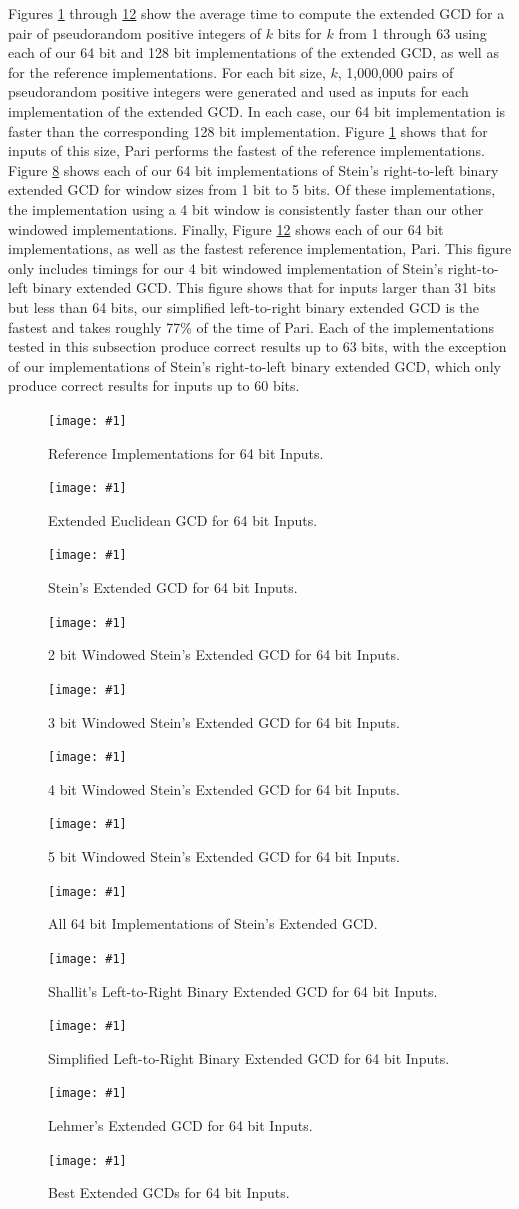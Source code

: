 \documentclass{ucalgthes1}
\theoremstyle{definition}
\newcommand{\mygraph}[3]{
	\begin{figure}[htb]
	\centering
	\texttt{[image: \#1]}
	\caption{#3}
	\label{#2}
	\end{figure}
}
\begin{document}
Figures \ref{fig:gcdRef64} through \ref{fig:gcdBest64} show the average time to compute the extended GCD for a pair of pseudorandom positive integers of $k$ bits for $k$ from 1 through 63 using each of our 64 bit and 128 bit implementations of the extended GCD, as well as for the reference implementations.  For each bit size, $k$, 1,000,000 pairs of pseudorandom positive integers were generated and used as inputs for each implementation of the extended GCD.  In each case, our 64 bit implementation is faster than the corresponding 128 bit implementation.  Figure \ref{fig:gcdRef64} shows that for inputs of this size, Pari performs the fastest of the reference implementations.  Figure \ref{fig:gcdSteins64} shows each of our 64 bit implementations of Stein's right-to-left binary extended GCD for window sizes from 1 bit to 5 bits.  Of these implementations, the implementation using a 4 bit window is consistently faster than our other windowed implementations.  Finally, Figure \ref{fig:gcdBest64} shows each of our 64 bit implementations, as well as the fastest reference implementation, Pari.   This figure only includes timings for our 4 bit windowed implementation of Stein's right-to-left binary extended GCD.  This figure shows that for inputs larger than 31 bits but less than 64 bits, our simplified left-to-right binary extended GCD is the fastest and takes roughly 77\% of the time of Pari.   Each of the implementations tested in this subsection produce correct results up to 63 bits, with the exception of our implementations of Stein's right-to-left binary extended GCD, which only produce correct results for inputs up to 60 bits.

\mygraph{reference-impl-64}{fig:gcdRef64}{Reference Implementations for 64 bit Inputs.}
\mygraph{divrem-64}{fig:gcdDivrem64}{Extended Euclidean GCD for 64 bit Inputs.}
\mygraph{stein1-64}{fig:gcdStein1-64}{Stein's Extended GCD for 64 bit Inputs.}
\mygraph{stein2-64}{fig:gcdStein2-64}{2 bit Windowed Stein's Extended GCD for 64 bit Inputs.}
\mygraph{stein3-64}{fig:gcdStein3-64}{3 bit Windowed Stein's Extended GCD for 64 bit Inputs.}
\mygraph{stein4-64}{fig:gcdStein4-64}{4 bit Windowed Stein's Extended GCD for 64 bit Inputs.}
\mygraph{stein5-64}{fig:gcdStein5-64}{5 bit Windowed Stein's Extended GCD for 64 bit Inputs.}
\mygraph{steins-64}{fig:gcdSteins64}{All 64 bit Implementations of Stein's Extended GCD.}
\mygraph{shallit-64}{fig:gcdShallit64}{Shallit's Left-to-Right Binary Extended GCD for 64 bit Inputs.}
\mygraph{binary_l2r-64}{fig:gcdL2R64}{Simplified Left-to-Right Binary Extended GCD for 64 bit Inputs.}
\mygraph{lehmer-64}{fig:gcdLehmer64}{Lehmer's Extended GCD for 64 bit Inputs.}
\mygraph{best-64}{fig:gcdBest64}{Best Extended GCDs for 64 bit Inputs.}
\end{document}
